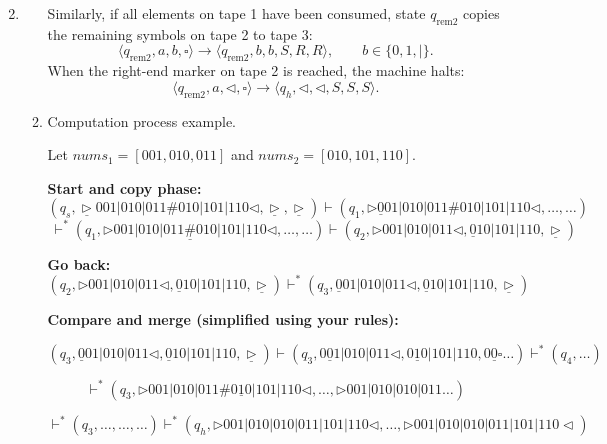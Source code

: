 \documentclass[12pt,a4paper]{article}
\makeatletter
\newtheorem*{solution}{Solution}
\theoremstyle{definition}
\renewenvironment{solution}[1][Solution] {\par\pushQED{\qed}\normalfont\topsep6\p@\@plus6\p@\relax\trivlist\item[\hskip\labelsep\bfseries#1\@addpunct{.}]\ignorespaces}{\popQED\endtrivlist\@endpefalse} \makeatother
\makeatother
\begin{document}
\begin{enumerate}
\begin{solution}
\begin{enumerate}
            Similarly, if all elements on tape 1 have been consumed, state \(q_{\mathrm{rem2}}\) copies the remaining symbols on tape 2 to tape 3: \[ \langle q_{\mathrm{rem2}},a,b,\square\rangle \to \langle q_{\mathrm{rem2}},b,b,S,R,R\rangle , \qquad b\in\{0,1,\vert\}. \] When the right-end marker on tape 2 is reached, the machine halts: \[ \langle q_{\mathrm{rem2}},a,\triangleleft,\square\rangle \to \langle q_h,\triangleleft,\triangleleft,S,S,S\rangle . \]
            
            
            
            \item Computation process example.

            Let \(nums_1 = [001, 010, 011]\) and \(nums_2 = [010, 101, 110]\).

            \medskip

            \noindent\textbf{Start and copy phase:}
        \[
        (q_s, \underline{\triangleright}001|010|011\#010|101|110\triangleleft, \underline{\triangleright}, \underline{\triangleright})
        \vdash
        (q_1, \triangleright \underline{0}01|010|011\#010|101|110\triangleleft, \dots, \dots)
        \]
        \[\
        \vdash^* 
        (q_1, \triangleright 001|010|011\underline{\#}010|101|110\triangleleft, \dots, \dots)
        \vdash
        (q_2, \triangleright 001|010|011\triangleleft, \underline{0}10|101|110, \underline{\triangleright})
        \]
        
        \medskip
        \noindent\textbf{Go back:}
        \[
        (q_2, \triangleright 001|010|011\triangleleft, \underline{0}10|101|110, \underline{\triangleright})
        \vdash^* 
        (q_3, \underline{0}01|010|011\triangleleft, \underline{0}10|101|110, \underline{\triangleright})
        \]
        
        \medskip
        \noindent\textbf{Compare and merge (simplified using your rules):}
        
        \[
        (q_3, \underline{0}01|010|011\triangleleft, \underline{0}10|101|110, \underline{\triangleright})
        \vdash
        (q_3, 0\underline{0}1|010|011\triangleleft, 0\underline{1}0|101|110, 0\underline{0}\square\dots)
        \vdash^* 
        (q_4, \dots)
        \]
        
        \[
        \vdash^* 
        (q_3, \triangleright 001|010|011\#0\underline{1}0|101|110\triangleleft, \dots, \triangleright 001|010|010|011\dots)
        \]
        
        \[
        \vdash^* 
        (q_3, \dots, \dots, \dots)
        \vdash^* 
        (q_h, \triangleright 001|010|010|011|101|110 \triangleleft, \dots, \triangleright 001|010|010|011|101|110 \triangleleft)
        \]
        

\end{enumerate}
\end{solution}
\end{enumerate}
\end{document}

